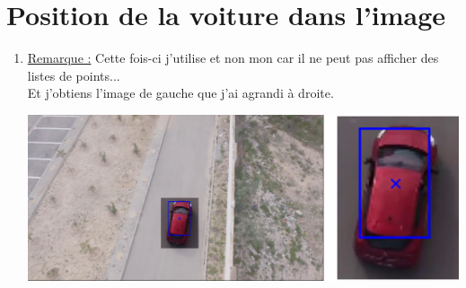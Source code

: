 \section{Position de la voiture dans l'image}
\begin{enumerate}
  \item {}
        \ul{Remarque :} Cette fois-ci j'utilise  et non mon 
        car il ne peut pas afficher des listes de points...\\
        Et j'obtiens l'image de gauche que j'ai agrandi à droite.
        \begin{center}
          \includegraphics[scale=0.25]{section-04/q1-3.png}
        \end{center}
\end{enumerate}
